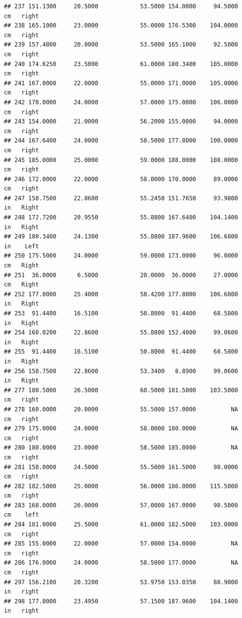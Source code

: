 \documentclass[]{article}
\begin{document}
\begin{verbatim}
## 237 151.1300     20.5000            53.5000 154.0000     94.5000     cm   right
## 238 165.1000     23.0000            55.0000 176.5300    104.0000     cm   right
## 239 157.4800     20.0000            53.5000 165.1000     92.5000     cm   right
## 240 174.6250     23.5000            61.0000 180.3400    105.0000     cm   right
## 241 167.0000     22.0000            55.0000 171.0000    105.0000     cm   right
## 242 170.0000     24.0000            57.0000 175.0000    106.0000     cm   right
## 243 154.0000     21.0000            56.2000 155.0000     94.0000     cm   right
## 244 167.6400     24.0000            58.5000 177.8000    100.0000     cm   right
## 245 185.0000     25.0000            59.0000 188.0000    108.0000     cm   right
## 246 172.0000     22.0000            58.0000 170.0000     89.0000     cm   right
## 247 158.7500     22.8600            55.2450 151.7650     93.9800     in   Right
## 248 172.7200     20.9550            55.8800 167.6400    104.1400     in   Right
## 249 180.3400     24.1300            55.8800 187.9600    106.6800     in    Left
## 250 175.5000     24.0000            59.0000 173.0000     96.0000     cm   Right
## 251  36.0000      6.5000            20.0000  36.0000     27.0000     cm   Right
## 252 177.8000     25.4000            58.4200 177.8000    106.6800     in   Right
## 253  91.4400     16.5100            50.8000  91.4400     68.5800     in   Right
## 254 160.0200     22.8600            55.8800 152.4000     99.0600     in   Right
## 255  91.4400     16.5100            50.8000  91.4400     68.5800     in   Right
## 256 158.7500     22.8600            53.3400   8.8900     99.0600     in   Right
## 277 180.5000     26.5000            60.5000 181.5000    103.5000     cm   right
## 278 160.0000     20.0000            55.5000 157.0000          NA     cm   right
## 279 175.0000     24.0000            58.0000 180.0000          NA     cm   right
## 280 180.0000     23.0000            58.5000 185.0000          NA     cm   right
## 281 158.0000     24.5000            55.5000 161.5000     98.0000     cm   right
## 282 182.5000     25.0000            56.0000 186.0000    115.5000     cm   right
## 283 168.0000     26.0000            57.0000 167.0000     98.5000     cm    left
## 284 181.0000     25.5000            61.0000 182.5000    103.0000     cm   right
## 285 155.0000     22.0000            57.0000 154.0000          NA     cm   right
## 286 176.0000     24.0000            58.5000 177.0000          NA     cm   right
## 297 156.2100     20.3200            53.9750 153.0350     88.9000     in   right
## 298 177.8000     23.4950            57.1500 187.9600    104.1400     in   right

\end{verbatim}
\end{document}
